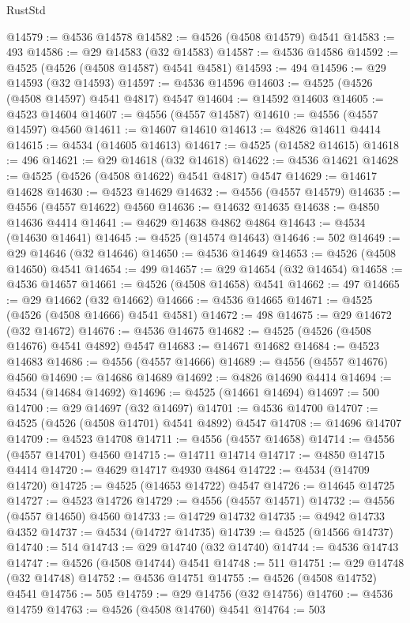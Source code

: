 \begin{lexlean}{RustStd}
\begin{coremodule}
{\begin{coremodule}
{{{{{{{{{{{{{{{{{{{{{{{{{{{{{{{{{{{{{{{{{{{{{{{{{{{{{{{@14579 := @4536 @14578
@14582 := @4526 (@4508 @14579) @4541
@14583 := 493
@14586 := @29 @14583 (@32 @14583)
@14587 := @4536 @14586
@14592 := @4525 (@4526 (@4508 @14587) @4541 @4581)
@14593 := 494
@14596 := @29 @14593 (@32 @14593)
@14597 := @4536 @14596
@14603 := @4525 (@4526 (@4508 @14597) @4541 @4817) @4547
@14604 := @14592 @14603
@14605 := @4523 @14604
@14607 := @4556 (@4557 @14587)
@14610 := @4556 (@4557 @14597) @4560
@14611 := @14607 @14610
@14613 := @4826 @14611 @4414
@14615 := @4534 (@14605 @14613)
@14617 := @4525 (@14582 @14615)
@14618 := 496
@14621 := @29 @14618 (@32 @14618)
@14622 := @4536 @14621
@14628 := @4525 (@4526 (@4508 @14622) @4541 @4817) @4547
@14629 := @14617 @14628
@14630 := @4523 @14629
@14632 := @4556 (@4557 @14579)
@14635 := @4556 (@4557 @14622) @4560
@14636 := @14632 @14635
@14638 := @4850 @14636 @4414
@14641 := @4629 @14638 @4862 @4864
@14643 := @4534 (@14630 @14641)
@14645 := @4525 (@14574 @14643)
@14646 := 502
@14649 := @29 @14646 (@32 @14646)
@14650 := @4536 @14649
@14653 := @4526 (@4508 @14650) @4541
@14654 := 499
@14657 := @29 @14654 (@32 @14654)
@14658 := @4536 @14657
@14661 := @4526 (@4508 @14658) @4541
@14662 := 497
@14665 := @29 @14662 (@32 @14662)
@14666 := @4536 @14665
@14671 := @4525 (@4526 (@4508 @14666) @4541 @4581)
@14672 := 498
@14675 := @29 @14672 (@32 @14672)
@14676 := @4536 @14675
@14682 := @4525 (@4526 (@4508 @14676) @4541 @4892) @4547
@14683 := @14671 @14682
@14684 := @4523 @14683
@14686 := @4556 (@4557 @14666)
@14689 := @4556 (@4557 @14676) @4560
@14690 := @14686 @14689
@14692 := @4826 @14690 @4414
@14694 := @4534 (@14684 @14692)
@14696 := @4525 (@14661 @14694)
@14697 := 500
@14700 := @29 @14697 (@32 @14697)
@14701 := @4536 @14700
@14707 := @4525 (@4526 (@4508 @14701) @4541 @4892) @4547
@14708 := @14696 @14707
@14709 := @4523 @14708
@14711 := @4556 (@4557 @14658)
@14714 := @4556 (@4557 @14701) @4560
@14715 := @14711 @14714
@14717 := @4850 @14715 @4414
@14720 := @4629 @14717 @4930 @4864
@14722 := @4534 (@14709 @14720)
@14725 := @4525 (@14653 @14722) @4547
@14726 := @14645 @14725
@14727 := @4523 @14726
@14729 := @4556 (@4557 @14571)
@14732 := @4556 (@4557 @14650) @4560
@14733 := @14729 @14732
@14735 := @4942 @14733 @4352
@14737 := @4534 (@14727 @14735)
@14739 := @4525 (@14566 @14737)
@14740 := 514
@14743 := @29 @14740 (@32 @14740)
@14744 := @4536 @14743
@14747 := @4526 (@4508 @14744) @4541
@14748 := 511
@14751 := @29 @14748 (@32 @14748)
@14752 := @4536 @14751
@14755 := @4526 (@4508 @14752) @4541
@14756 := 505
@14759 := @29 @14756 (@32 @14756)
@14760 := @4536 @14759
@14763 := @4526 (@4508 @14760) @4541
@14764 := 503
}}}}}}}}}}}}}}}}}}}}}}}}}}}}}}}}}}}}}}}}}}}}}}}}}}}}}}}
\end{coremodule}}
\end{coremodule}
\end{lexlean}
